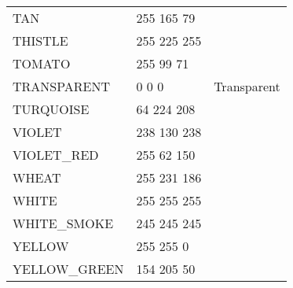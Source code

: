 \begin{longtable}{l|l|l}
TAN & 255 165 79 & \colorbox[RGB]{255 165 79}{\phantom{MMMMMMMM}}\\
THISTLE & 255 225 255 & \colorbox[RGB]{255 225 255}{\phantom{MMMMMMMM}}\\
TOMATO & 255 99 71 & \colorbox[RGB]{255 99 71}{\phantom{MMMMMMMM}}\\
TRANSPARENT & 0 0 0 & Transparent \\
TURQUOISE & 64 224 208 & \colorbox[RGB]{64 224 208}{\phantom{MMMMMMMM}}\\
VIOLET & 238 130 238 & \colorbox[RGB]{238 130 238}{\phantom{MMMMMMMM}}\\
VIOLET\_RED & 255 62 150 & \colorbox[RGB]{255 62 150}{\phantom{MMMMMMMM}}\\
WHEAT & 255 231 186 & \colorbox[RGB]{255 231 186}{\phantom{MMMMMMMM}}\\
WHITE & 255 255 255 & \colorbox[RGB]{255 255 255}{\phantom{MMMMMMMM}}\\
WHITE\_SMOKE & 245 245 245 & \colorbox[RGB]{245 245 245}{\phantom{MMMMMMMM}}\\
YELLOW & 255 255 0 & \colorbox[RGB]{255 255 0}{\phantom{MMMMMMMM}}\\
YELLOW\_GREEN & 154 205 50 & \colorbox[RGB]{154 205 50}{\phantom{MMMMMMMM}}
\end{longtable}
